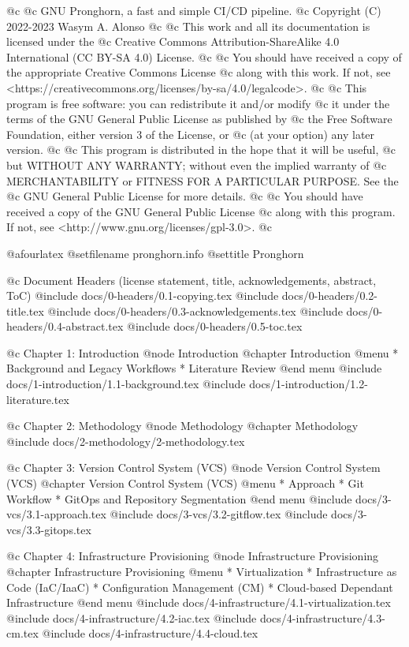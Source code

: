 


@c
@c GNU Pronghorn, a fast and simple CI/CD pipeline.
@c Copyright (C) 2022-2023 Wasym A. Alonso
@c
@c This work and all its documentation is licensed under the
@c Creative Commons Attribution-ShareAlike 4.0 International (CC BY-SA 4.0) License.
@c
@c You should have received a copy of the appropriate Creative Commons License
@c along with this work. If not, see <https://creativecommons.org/licenses/by-sa/4.0/legalcode>.
@c
@c This program is free software: you can redistribute it and/or modify
@c it under the terms of the GNU General Public License as published by
@c the Free Software Foundation, either version 3 of the License, or
@c (at your option) any later version.
@c
@c This program is distributed in the hope that it will be useful,
@c but WITHOUT ANY WARRANTY; without even the implied warranty of
@c MERCHANTABILITY or FITNESS FOR A PARTICULAR PURPOSE. See the
@c GNU General Public License for more details.
@c
@c You should have received a copy of the GNU General Public License
@c along with this program. If not, see <http://www.gnu.org/licenses/gpl-3.0>.
@c


@afourlatex
@setfilename pronghorn.info
@settitle Pronghorn


@c Document Headers (license statement, title, acknowledgements, abstract, ToC)
@include docs/0-headers/0.1-copying.tex
@include docs/0-headers/0.2-title.tex
@include docs/0-headers/0.3-acknowledgements.tex
@include docs/0-headers/0.4-abstract.tex
@include docs/0-headers/0.5-toc.tex


@c Chapter 1: Introduction
@node Introduction
@chapter Introduction
@menu
* Background and Legacy Workflows
* Literature Review
@end menu
@include docs/1-introduction/1.1-background.tex
@include docs/1-introduction/1.2-literature.tex

@c Chapter 2: Methodology
@node Methodology
@chapter Methodology
@include docs/2-methodology/2-methodology.tex

@c Chapter 3: Version Control System (VCS)
@node Version Control System (VCS)
@chapter Version Control System (VCS)
@menu
* Approach
* Git Workflow
* GitOps and Repository Segmentation
@end menu
@include docs/3-vcs/3.1-approach.tex
@include docs/3-vcs/3.2-gitflow.tex
@include docs/3-vcs/3.3-gitops.tex

@c Chapter 4: Infrastructure Provisioning
@node Infrastructure Provisioning
@chapter Infrastructure Provisioning
@menu
* Virtualization
* Infrastructure as Code (IaC/IaaC)
* Configuration Management (CM)
* Cloud-based Dependant Infrastructure
@end menu
@include docs/4-infrastructure/4.1-virtualization.tex
@include docs/4-infrastructure/4.2-iac.tex
@include docs/4-infrastructure/4.3-cm.tex
@include docs/4-infrastructure/4.4-cloud.tex

